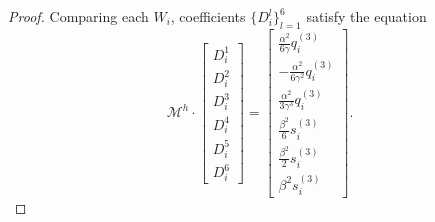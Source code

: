 \documentclass[11pt,letterpaper]{amsart}
\newcommand{\mM}{\mathcal{M}}
\theoremstyle{definition}
\theoremstyle{remark}
\numberwithin{equation}{section}
\begin{document}
\begin{proof}
Comparing each $W_i$, coefficients $\{D^l_i\}_{l=1}^6$ satisfy the equation
\begin{equation}\label{eq:D}
    \mM^{h}\cdot \begin{bmatrix}
      D^1_i\\
        D^2_i\\
        D^3_i\\
        D^4_i\\
        D^5_i\\
        D^6_i
    \end{bmatrix}=\begin{bmatrix}
       \frac{\alpha^2}{6\gamma}q^{(3)}_i\\
        -\frac{\alpha^2}{6\gamma^2}q^{(3)}_i\\
        \frac{\alpha^2}{3\gamma^3}q^{(3)}_i\\
        \frac{\beta^2}{6}s^{(3)}_i\\
        \frac{\beta^2}{2}s^{(3)}_i\\
       \beta^2s^{(3)}_i
    \end{bmatrix}.
\end{equation}


\end{proof}
\end{document}
